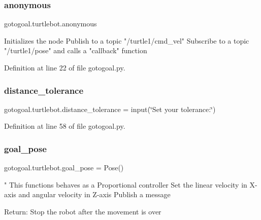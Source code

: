 \subsubsection{\texorpdfstring{anonymous}{anonymous}}
{\footnotesize\ttfamily gotogoal.\+turtlebot.\+anonymous\hspace{0.3cm}{\ttfamily [static]}}

\begin{DoxyVerb}Initializes the node
Publish to a topic "/turtle1/cmd_vel"
Subscribe to a topic "/turtle1/pose" and calls a "callback" function\end{DoxyVerb}
 

Definition at line 22 of file gotogoal.\+py.

\mbox{\label{classgotogoal_1_1turtlebot_a27d8db8e02fc4c5645333233f0330ec7}} 
\subsubsection{\texorpdfstring{distance\+\_\+tolerance}{distance\_tolerance}}
{\footnotesize\ttfamily gotogoal.\+turtlebot.\+distance\+\_\+tolerance = input(\char`\"{}Set your tolerance\+:\char`\"{})\hspace{0.3cm}{\ttfamily [static]}}



Definition at line 58 of file gotogoal.\+py.

\mbox{\label{classgotogoal_1_1turtlebot_a94012c2e05fac094807f73e99c9d6bcf}} 
\subsubsection{\texorpdfstring{goal\+\_\+pose}{goal\_pose}}
{\footnotesize\ttfamily gotogoal.\+turtlebot.\+goal\+\_\+pose = Pose()\hspace{0.3cm}{\ttfamily [static]}}

\begin{DoxyVerb}"
This functions behaves as a Proportional controller
Set the linear velocity in X-axis and angular velocity in Z-axis
Publish a message

Return:
Stop the robot after the movement is over
\end{DoxyVerb}
 

